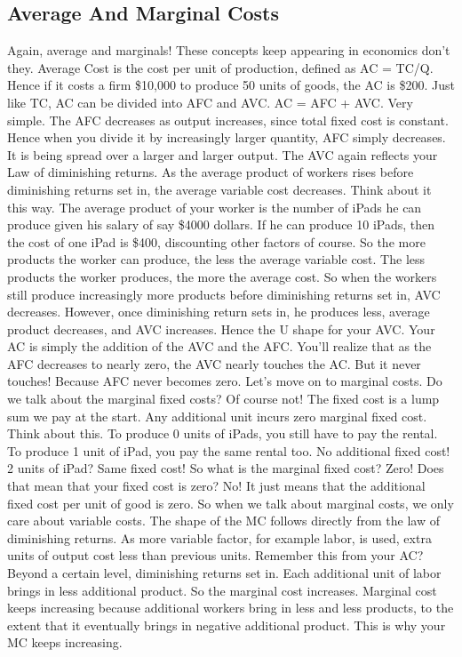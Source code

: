 \subsection{Average And Marginal Costs}
Again, average and marginals! These concepts keep appearing in economics don't they. Average Cost is the cost per unit of production, defined as AC = TC/Q. Hence if it costs a firm \$10,000 to produce 50 units of goods, the AC is \$200. Just like TC, AC can be divided into AFC and AVC. AC = AFC + AVC. Very simple. The AFC decreases as output increases, since total fixed cost is constant. Hence when you divide it by increasingly larger quantity, AFC simply decreases. It is being spread over a larger and larger output. The AVC again reflects your Law of diminishing returns. As the average product of workers rises before diminishing returns set in, the average variable cost decreases. Think about it this way. The average product of your worker is the number of iPads he can produce given his salary of say \$4000 dollars. If he can produce 10 iPads, then the cost of one iPad is \$400, discounting other factors of course. So the more products the worker can produce, the less the average variable cost. The less products the worker produces, the more the average cost. So when the workers still produce increasingly more products before diminishing returns set in, AVC decreases. However, once diminishing return sets in, he produces less, average product decreases, and AVC increases. Hence the U shape for your AVC. Your AC is simply the addition of the AVC and the AFC. You'll realize that as the AFC decreases to nearly zero, the AVC nearly touches the AC. But it never touches! Because AFC never becomes zero. 
 Let's move on to marginal costs. Do we talk about the marginal fixed costs? Of course not! The fixed cost is a lump sum we pay at the start. Any additional unit incurs zero marginal fixed cost. Think about this. To produce 0 units of iPads, you still have to pay the rental. To produce 1 unit of iPad, you pay the same rental too. No additional fixed cost! 2 units of iPad? Same fixed cost! So what is the marginal fixed cost? Zero! Does that mean that your fixed cost is zero? No! It just means that the additional fixed cost per unit of good is zero. So when we talk about marginal costs, we only care about variable costs. The shape of the MC follows directly from the law of diminishing returns. As more variable factor, for example labor, is used, extra units of output cost less than previous units. Remember this from your AC? Beyond a certain level, diminishing returns set in. Each additional unit of labor brings in less additional product. So the marginal cost increases. Marginal cost keeps increasing because additional workers bring in less and less products, to the extent that it eventually brings in negative additional product. This is why your MC keeps increasing.

